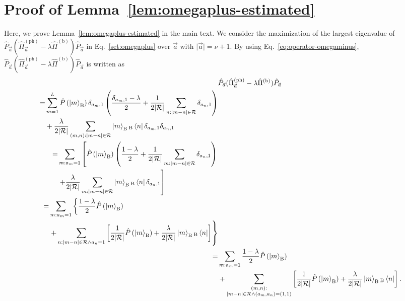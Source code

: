 \documentclass[twocolumn,superscriptaddress,pra,footinbib,notitlepage]{revtex4-1}
\newcommand{\1}{\mbox{1}\hspace{-0.25em}\mbox{l}}
\newcommand{\abs}[1]{\lvert#1\rvert}
\begin{document}
\section{Proof of Lemma~\ref{lem:omegaplus-estimated}}
\label{append:lemma2}
Here, we prove Lemma~\ref{lem:omegaplus-estimated} in the main text. We consider the maximization of the largest eigenvalue of $\hat{P}_{\vec{a}}(\hat{\Pi}_{\vec{a}}^{(\textrm{ph})}-\lambda\hat{\Pi}^{(\textrm{b})})\hat{P}_{\vec{a}}$ in Eq.~\eqref{set:omegaplus} over $\vec{a}$ with $\abs{\vec{a}}=\nu+1$. By using Eq.~\eqref{eq:operator-omegaminus}, $\hat{P}_{\vec{a}}(\hat{\Pi}_{\vec{a}}^{(\textrm{ph})}-\lambda\hat{\Pi}^{(\textrm{b})})\hat{P}_{\vec{a}}$ is written as
\begin{align}
&\hat{P}_{\vec{a}}(\hat{\Pi}_{\vec{a}}^{(\textrm{ph})}-\lambda\hat{\Pi}^{(\textrm{b})})\hat{P}_{\vec{a}}\nonumber\\
\begin{split}
=&\sum_{m=1}^L\hat{P}\left(\ket{m}_\textrm{B}\right)\delta_{a_m, 1}\left(\frac{\delta_{a_m, 1}-\lambda}{2}+\frac{1}{2\abs{\mathcal{R}}}\sum_{n:\abs{m-n}\in\mathcal{R}}\delta_{a_n, 1}\right)\\
&+\frac{\lambda}{2\abs{\mathcal{R}}}\sum_{(m, n):\abs{m-n}\in\mathcal{R}}\ket{m}_\textrm{B}{}_\textrm{B}\bra{n}\delta_{a_m, 1}\delta_{a_n, 1}
\end{split}\nonumber\\
\begin{split}
=&\sum_{m: a_m=1}\left[\hat{P}\left(\ket{m}_\textrm{B}\right)\left(\frac{1-\lambda}{2}+\frac{1}{2\abs{\mathcal{R}}}\sum_{m:\abs{m-n}\in\mathcal{R}}\delta_{a_n, 1}\right)\right.\\
&\left.+\frac{\lambda}{2\abs{\mathcal{R}}}\sum_{m:\abs{m-n}\in\mathcal{R}}\ket{m}_\textrm{B}{}_\textrm{B}\bra{n}\delta_{a_n, 1}\right]
\end{split}\nonumber\\
\begin{split}
=&\sum_{m: a_m=1}\left\{\frac{1-\lambda}{2}\hat{P}\left(\ket{m}_\textrm{B}\right)\right.\\
&\left.+\sum_{n:\abs{m-n}\in\mathcal{R}\wedge a_n=1}\left[\frac{1}{2\abs{\mathcal{R}}}\hat{P}\left(\ket{m}_\textrm{B}\right)+\frac{\lambda}{2\abs{\mathcal{R}}}\ket{m}_\textrm{B}{}_\textrm{B}\bra{n}\right]\right\}
\end{split}\nonumber\\
=&\sum_{m: a_m=1}\frac{1-\lambda}{2}\hat{P}\left(\ket{m}_\textrm{B}\right)\nonumber\\
&+\sum_{\substack{(m, n):\\\abs{m-n}\in\mathcal{R}\wedge(a_m, a_n)=(1, 1)}}\left[\frac{1}{2\abs{\mathcal{R}}}\hat{P}\left(\ket{m}_\textrm{B}\right)+\frac{\lambda}{2\abs{\mathcal{R}}}\ket{m}_\textrm{B}{}_\textrm{B}\bra{n}\right].
\label{eq:operator-omegaplus}
\end{align}
\end{document}
